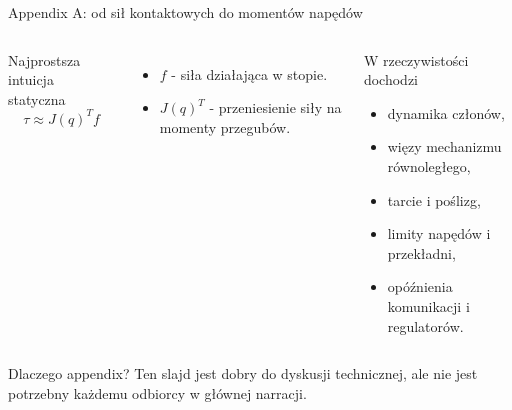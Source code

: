 \appendix
\begin{frame}{Appendix A: od sił kontaktowych do momentów napędów}
\begin{columns}[T,onlytextwidth]
\begin{block}{Najprostsza intuicja statyczna}
\[
\tau \approx J(q)^T f
\]
\end{block}
\begin{itemize}
  \item $f$ - siła działająca w stopie.
  \item $J(q)^T$ - przeniesienie siły na momenty przegubów.
\end{itemize}
\begin{block}{W rzeczywistości dochodzi}
\begin{itemize}
  \item dynamika członów,
  \item więzy mechanizmu równoległego,
  \item tarcie i poślizg,
  \item limity napędów i przekładni,
  \item opóźnienia komunikacji i regulatorów.
\end{itemize}
\end{block}
\end{columns}
\begin{block}{Dlaczego appendix?}
Ten slajd jest dobry do dyskusji technicznej, ale nie jest potrzebny każdemu odbiorcy w głównej narracji.
\end{block}
\end{frame}

